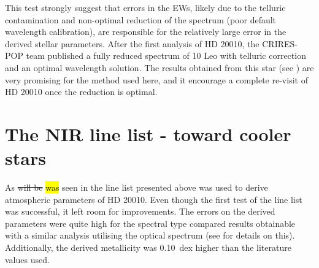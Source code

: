 This test strongly suggest that errors in the EWs, likely due to the telluric contamination and
non-optimal reduction of the spectrum (poor default wavelength calibration), are responsible for the
relatively large error in the derived stellar parameters. After the first analysis of HD 20010, the
CRIRES-POP team published a fully reduced spectrum of 10 Leo \citep{Nicholls2017} with telluric
correction and an optimal wavelength solution. The results obtained from this star (see
) are very promising for the method used here, and it encourage a complete re-visit
of HD 20010 once the reduction is optimal.


\section{The NIR line list - toward cooler stars}
\label{sec:linelist_second}

As \st{will be} \hl{was} seen in  the line list presented above was used to
derive atmospheric parameters of HD 20010. Even though the first test of the line list was
successful, it left room for improvements. The errors on the derived parameters were quite high for
the spectral type compared results obtainable with a similar analysis utilising the optical spectrum
(see  for details on this). Additionally, the derived metallicity was
\SI{0.10}{dex} higher than the literature values used.


